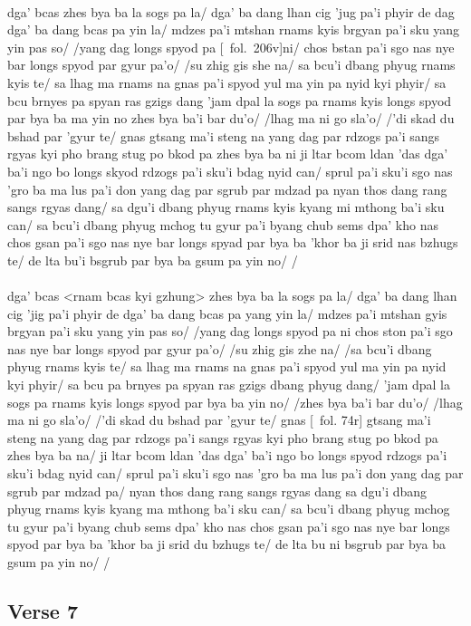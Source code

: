 \documentclass[12pt]{article}
\begin{document}
\textbf{\TVA}\\
dga' bcas zhes bya ba la sogs pa la/ dga' ba dang lhan cig 'jug pa'i phyir de dag dga' ba dang bcas pa yin la/ mdzes pa'i mtshan rnams kyis brgyan pa'i sku yang yin pas so/ /yang dag longs spyod pa [\TVA\ fol.\ 206v]ni/ chos bstan pa'i sgo nas nye bar longs spyod par gyur pa'o/ /su zhig gis she na/ sa bcu'i dbang phyug rnams kyis te/ sa lhag ma rnams na gnas pa'i spyod yul ma yin pa nyid kyi phyir/ sa bcu brnyes pa spyan ras gzigs dang 'jam dpal la sogs pa rnams kyis longs spyod par bya ba ma yin no zhes bya ba'i bar du'o/ /lhag ma ni go sla'o/ /'di skad du bshad par 'gyur te/ gnas gtsang ma'i steng na yang dag par rdzogs pa'i sangs rgyas kyi pho brang stug po bkod pa zhes bya ba ni ji ltar bcom ldan 'das dga' ba'i ngo bo longs skyod rdzogs pa'i sku'i bdag nyid can/ sprul pa'i sku'i sgo nas 'gro ba ma lus pa'i don yang dag par sgrub par mdzad pa nyan thos dang rang sangs rgyas dang/ sa dgu'i dbang phyug rnams kyis kyang mi mthong ba'i sku can/ sa bcu'i dbang phyug mchog tu gyur pa'i byang chub sems dpa' kho nas chos gsan pa'i sgo nas nye bar longs spyad par bya ba 'khor ba ji srid nas bzhugs te/ de lta bu'i bsgrub par bya ba gsum pa yin no/ /\\

\textbf{\TVB}\\
dga' bcas <rnam bcas kyi gzhung> zhes bya ba la sogs pa la/ dga' ba dang lhan cig 'jig pa'i phyir de dga' ba dang bcas pa yang yin la/ mdzes pa'i mtshan gyis brgyan pa'i sku yang yin pas so/ /yang dag longs spyod pa ni chos ston pa'i sgo nas nye bar longs spyod par gyur pa'o/ /su zhig gis zhe na/ /sa bcu'i dbang phyug rnams kyis te/ sa lhag ma rnams na gnas pa'i spyod yul ma yin pa nyid kyi phyir/ sa bcu pa brnyes pa spyan ras gzigs dbang phyug dang/ 'jam dpal la sogs pa rnams kyis longs spyod par bya ba yin no/ /zhes bya ba'i bar du'o/ /lhag ma ni go sla'o/ /'di skad du bshad par 'gyur te/ gnas [\TVB\ fol. 74r] gtsang ma'i steng na yang dag par rdzogs pa'i sangs rgyas kyi pho brang stug po bkod pa zhes bya ba na/ ji ltar bcom ldan 'das dga' ba'i ngo bo longs spyod rdzogs pa'i sku'i bdag nyid can/ sprul pa'i sku'i sgo nas 'gro ba ma lus pa'i don yang dag par sgrub par mdzad pa/ nyan thos dang rang sangs rgyas dang sa dgu'i dbang phyug rnams kyis kyang ma mthong ba'i sku can/ sa bcu'i dbang phyug mchog tu gyur pa'i byang chub sems dpa' kho nas chos gsan pa'i sgo nas nye bar longs spyod par bya ba 'khor ba ji srid du bzhugs te/ de lta bu ni bsgrub par bya ba gsum pa yin no/ /

\subsection{Verse 7}
\end{document}
